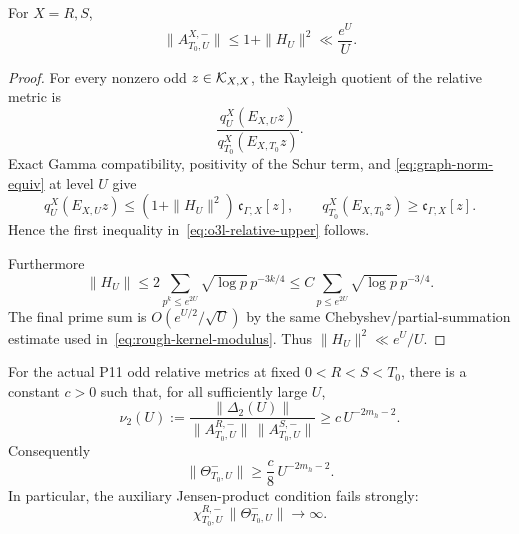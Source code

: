 \begin{lemma}\label{lem:o3l-relative-upper}
For $X=R,S$,
\[
 \boxed{
 \|A_{T_0,U}^{X,-}\|\le 1+\|H_U\|^2
 \ll \frac{e^U}{U}.
 }
\tag{O3L.3}\label{eq:o3l-relative-upper}
\]
\end{lemma}

\begin{proof}
For every nonzero odd $z\in\mathcal K_{X,X}$, the Rayleigh quotient of the relative metric is
\[
 \frac{q_U^X(E_{X,U}z)}{q_{T_0}^X(E_{X,T_0}z)}.
\]
Exact Gamma compatibility, positivity of the Schur term, and
\eqref{eq:graph-norm-equiv} at level $U$ give
\[
 q_U^X(E_{X,U}z)
 \le (1+\|H_U\|^2)\,\mathfrak c_{\Gamma,X}[z],
 \qquad
 q_{T_0}^X(E_{X,T_0}z)\ge\mathfrak c_{\Gamma,X}[z].
\]
Hence the first inequality in~\eqref{eq:o3l-relative-upper} follows.

Furthermore
\[
 \|H_U\|
 \le2\sum_{p^k\le e^{2U}}\sqrt{\log p}\,p^{-3k/4}
 \le C\sum_{p\le e^{2U}}\sqrt{\log p}\,p^{-3/4}.
\]
The final prime sum is $O(e^{U/2}/\sqrt U)$ by the same Chebyshev/partial-summation
estimate used in~\eqref{eq:rough-kernel-modulus}.  Thus
$\|H_U\|^2\ll e^U/U$.
\end{proof}

\begin{theorem}\label{thm:o3l-polynomial-witness}
For the actual P11 odd relative metrics at fixed $0<R<S<T_0$, there is a constant
$c>0$ such that, for all sufficiently large $U$,
\[
 \boxed{
 \nu_2(U)
 :=\frac{\|\Delta_2(U)\|}
 {\|A_{T_0,U}^{R,-}\|\,\|A_{T_0,U}^{S,-}\|}
 \ge c\,U^{-2m_h-2}.
 }
\tag{O3L.4}\label{eq:o3l-nu-lower}
\]
Consequently
\[
 \boxed{
 \|\Theta_{T_0,U}^-\|\ge \frac c8\,U^{-2m_h-2}.
 }
\tag{O3L.5}\label{eq:o3l-theta-polynomial}
\]
In particular, the auxiliary Jensen-product condition fails strongly:
\[
 \boxed{
 \chi_{T_0,U}^{R,-}\,\|\Theta_{T_0,U}^-\|\longrightarrow\infty.
 }
\tag{O3L.6}\label{eq:o3l-product-diverges}
\]
\end{theorem}

